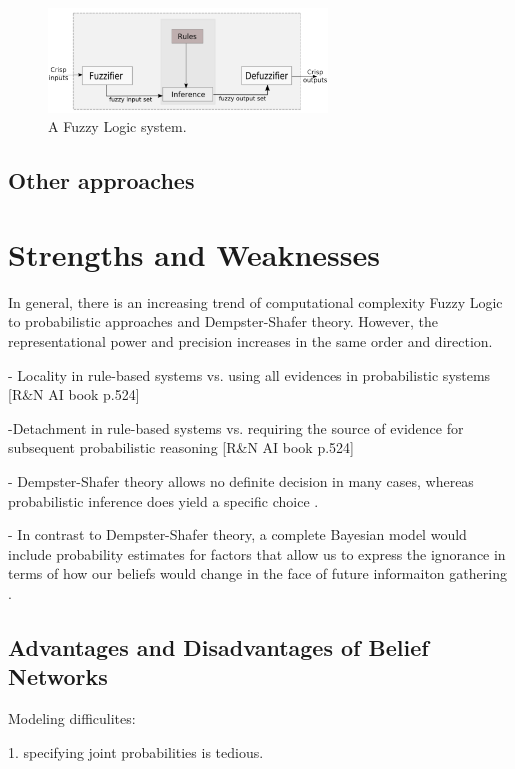\documentclass[11pt]{article}
\begin{document}
\begin{figure}[tbh]
  \center
  \includegraphics[width=0.66\textwidth]{figure/fuzzy-system.png}
  \caption{A Fuzzy Logic system.}
  \label{fig:fuzzy-system}
\end{figure}

\subsection{Other approaches}

\section{Strengths and Weaknesses}

In general, there is an increasing trend of computational complexity Fuzzy Logic
to probabilistic approaches and Dempster-Shafer theory. However, the
representational power and precision increases in the same order and direction.

- Locality in rule-based systems vs. using all evidences in probabilistic
systems [R\&N AI book p.524]

-Detachment in rule-based systems vs. requiring the source of evidence for
subsequent probabilistic reasoning [R\&N AI book p.524]

- Dempster-Shafer theory allows no definite decision in many cases, whereas
probabilistic inference does yield a specific choice \cite{russell:ai-modern}.

- In contrast to Dempster-Shafer theory, a complete Bayesian model would include
probability estimates for factors that allow us to express the ignorance in
terms of how our beliefs would change in the face of future informaiton
gathering \cite{russell:ai-modern}.

\subsection{Advantages and Disadvantages of Belief Networks}

Modeling difficulites:

1. specifying joint probabilities is tedious.
\end{document}
